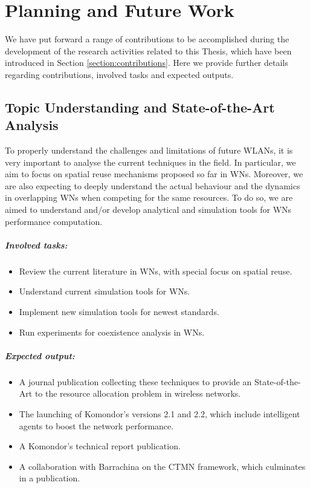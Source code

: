 \documentclass[12pt, a4paper,twoside]{tesi_upf}
\begin{document}
	\chapter{Planning and Future Work}
	\label{section:future_work}		
		We have put forward a range of contributions to be accomplished during the development of the research activities related to this Thesis, which have been introduced in Section \ref{section:contributions}. Here we provide further details regarding contributions, involved tasks and expected outputs.

		\section{Topic Understanding and State-of-the-Art Analysis}
		\label{section:contribution1}	
			To properly understand the challenges and limitations of future WLANs, it is very important to analyse the current techniques in the field. In particular, we aim to focus on spatial reuse mechanisms proposed so far in WNs. Moreover, we are also expecting to deeply understand the actual behaviour and the dynamics in overlapping WNs when competing for the same resources. To do so, we are aimed to understand and/or develop analytical and simulation tools for WNs performance computation.	
							
			\paragraph{Involved tasks:}		
			\begin{itemize}
				\item Review the current literature in WNs, with special focus on spatial reuse.
				\item Understand current simulation tools for WNs.
				\item Implement new simulation tools for newest standards.
				\item Run experiments for coexistence analysis in WNs.			
			\end{itemize}	
		
			\paragraph{Expected output:}		
			\begin{itemize}
				\item A journal publication collecting these techniques to provide an State-of-the-Art to the resource allocation problem in wireless networks.
				\item The launching of Komondor's versions 2.1 and 2.2, which include intelligent agents to boost the network performance. 
				\item A Komondor's technical report publication.	
				\item A collaboration with Barrachina on the CTMN framework, which culminates in a publication.		
			\end{itemize}	
\end{document}
